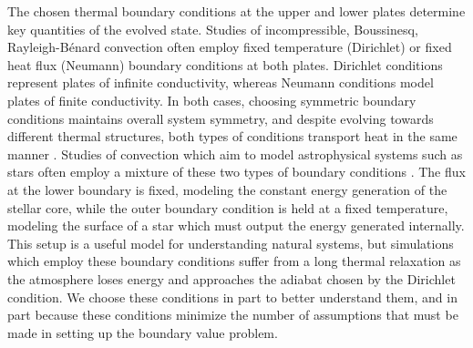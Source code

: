 \documentclass[aps, pre, onecolumn, nofootinbib, notitlepage, groupedaddress, amsfonts, amssymb, amsmath, longbibliography]{revtex4-1}
\newcommand{\RB}{Rayleigh-B\'{e}nard }
\begin{document}
The chosen thermal boundary conditions at the upper and lower plates
determine key quantities of the evolved state.
Studies of incompressible, Boussinesq, \RB convection often
employ fixed temperature (Dirichlet) or fixed heat flux
(Neumann) boundary conditions at both plates.  
Dirichlet conditions represent plates of infinite conductivity,
whereas Neumann conditions model plates of finite conductivity.  
In both cases, choosing symmetric boundary conditions maintains overall system symmetry, 
and despite evolving towards different thermal structures, both types of conditions
transport heat in the same manner \cite{johnston&doering2009}.
Studies of convection which aim to model
astrophysical systems such as stars often employ a mixture of these
two types of boundary conditions \cite{hurlburt&all1984, cattaneo&all1991, korre&all2017}.  
The flux at the lower boundary is fixed, modeling
the constant energy generation of the stellar core, 
while the outer boundary condition is held at a fixed temperature,
modeling the surface of a star which must output the energy generated internally.
This setup is a useful model for understanding natural
systems, but simulations which employ these boundary conditions suffer from a long 
thermal relaxation as the atmosphere loses energy and approaches the adiabat chosen by the
Dirichlet condition.  We choose these conditions in part to better understand them, and in
part because these conditions minimize the number of assumptions that must be made in
setting up the boundary value problem.
\end{document}
